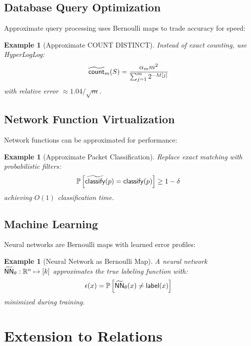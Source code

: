 \documentclass[11pt,final,hidelinks]{article}
\newtheorem{example}[theorem]{Example}
\newcommand{\Fun}[1]{\mathsf{#1}}     %
\newcommand{\AFun}[1]{\obs{\mathsf{#1}}}  %
\newcommand{\error}{\epsilon}
\newcommand{\Real}{\mathbb{R}}
\begin{document}
\subsection{Database Query Optimization}

Approximate query processing uses Bernoulli maps to trade accuracy for speed:

\begin{example}[Approximate COUNT DISTINCT]
Instead of exact counting, use HyperLogLog:
\begin{equation}
\AFun{count}_m(S) = \frac{\alpha_m m^2}{\sum_{j=1}^m 2^{-M[j]}}
\end{equation}
with relative error $\approx 1.04/\sqrt{m}$.
\end{example}

\subsection{Network Function Virtualization}

Network functions can be approximated for performance:

\begin{example}[Approximate Packet Classification]
Replace exact matching with probabilistic filters:
\begin{equation}
\Prob{\AFun{classify}(p) = \Fun{classify}(p)} \geq 1 - \delta
\end{equation}
achieving $O(1)$ classification time.
\end{example}

\subsection{Machine Learning}

Neural networks are Bernoulli maps with learned error profiles:

\begin{example}[Neural Network as Bernoulli Map]
A neural network $\AFun{NN}_\theta : \Real^n \mapsto [k]$ approximates the true labeling function with:
\begin{equation}
\error(x) = \Prob{\AFun{NN}_\theta(x) \neq \Fun{label}(x)}
\end{equation}
minimized during training.
\end{example}

\section{Extension to Relations}
\end{document}
